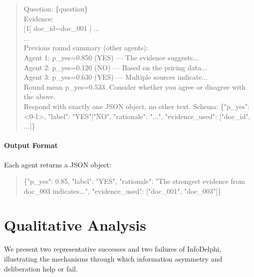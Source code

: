 \documentclass[11pt]{article}
\theoremstyle{plain}
\theoremstyle{definition}
\begin{document}
\begin{quote}
\small\ttfamily
Question: \{question\}\\[4pt]
Evidence:\\
{[}1{]} doc\_id=doc\_001 | ...\\
...\\[4pt]
Previous round summary (other agents):\\
\quad Agent 1: p\_yes=0.850 (YES) --- The evidence suggests...\\
\quad Agent 2: p\_yes=0.120 (NO) --- Based on the pricing data...\\
\quad Agent 3: p\_yes=0.630 (YES) --- Multiple sources indicate...\\
\quad Round mean p\_yes=0.533. Consider whether you agree or disagree with the above.\\[4pt]
Respond with exactly one JSON object, no other text. Schema: \{"p\_yes": <0-1>, "label": "YES"|"NO", "rationale": "...", "evidence\_used": {[}"doc\_id", ...{]}\}
\end{quote}

\paragraph{Output Format}

Each agent returns a JSON object:
\begin{quote}
\small\ttfamily
\{"p\_yes": 0.85, "label": "YES", "rationale": "The strongest evidence from doc\_003 indicates...", "evidence\_used": {[}"doc\_001", "doc\_003"{]}\}
\end{quote}

\section{Qualitative Analysis}
\label{sec:appendix_cases}

We present two representative successes and two failures of InfoDelphi,
illustrating the mechanisms through which information asymmetry and
deliberation help or fail.
\end{document}
